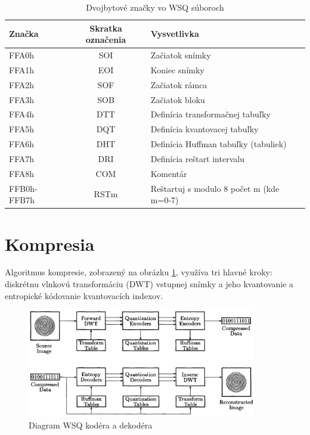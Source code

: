   \begin{table}
    \caption{Dvojbytové značky vo WSQ súboroch}
    \begin{center}
      \begin{tabular}{ |l c l| }
        \hline
        Značka & Skratka označenia & Vysvetlivka \\
        \hline
        FFA0h       & SOI  & Začiatok snímky \\
        FFA1h       & EOI  & Koniec snímky \\
        FFA2h       & SOF  & Začiatok rámca \\
        FFA3h       & SOB  & Začiatok bloku \\
        FFA4h       & DTT  & Definícia transformačnej tabuľky \\
        FFA5h       & DQT  & Definícia kvantovacej tabuľky \\
        FFA6h       & DHT  & Definícia Huffman tabuľky (tabuliek) \\
        FFA7h       & DRI  & Definícia reštart intervalu \\
        FFA8h       & COM  & Komentár \\
        FFB0h-FFB7h & RSTm & Reštartuj s modulo 8 počet m (kde m=0-7) \\
        \hline
      \end{tabular}
    \end{center}
    \label{tab:znacky_WSQ_suboru}
  \end{table}

  \section{Kompresia}
  Algoritmus kompresie, zobrazený na obrázku \ref{obr:WSQ_diagram}, využíva tri hlavné kroky: diskrétnu vlnkovú transformáciu (DWT) vstupnej snímky
  a jeho kvantovanie a entropické kódovanie kvantovacích indexov.

  \begin{figure}[]
    \centering
    \includegraphics[width=10cm]{obrazky-figures/WSQ_encoder_decoder.png}
    \caption{Diagram WSQ kodéra a dekodéra \cite{Bradley}}
    \label{obr:WSQ_diagram}
  \end{figure}
  
